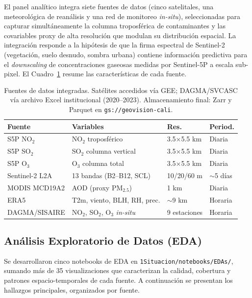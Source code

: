 \documentclass[10pt,a4paper,twocolumn]{article}
\begin{document}
El panel analítico integra siete fuentes de datos (cinco satelitales, una meteorológica de reanálisis y una red de monitoreo \textit{in-situ}), seleccionadas para capturar simultáneamente la columna troposférica de contaminantes y las covariables proxy de alta resolución que modulan su distribución espacial. La integración responde a la hipótesis de que la firma espectral de Sentinel-2 (vegetación, suelo desnudo, sombra urbana) contiene información predictiva para el \textit{downscaling} de concentraciones gaseosas medidas por Sentinel-5P a escala sub-pixel. El Cuadro~\ref{tab:fuentes} resume las características de cada fuente.

\begin{table}[H]
  \centering
  \scriptsize
  \begin{tabular}{p{2.1cm}p{2.1cm}p{1.2cm}p{1.5cm}}
    \toprule
    \textbf{Fuente} & \textbf{Variables} & \textbf{Res.} & \textbf{Period.} \\
    \midrule
    S5P NO$_2$ & NO$_2$ troposférico & 3.5$\times$5.5 km & Diaria \\
    S5P SO$_2$ & SO$_2$ columna vertical & 3.5$\times$5.5 km & Diaria \\
    S5P O$_3$ & O$_3$ columna total & 3.5$\times$5.5 km & Diaria \\
    Sentinel-2 L2A & 13 bandas (B2--B12, SCL) & 10/20/60 m & $\sim$5 días \\
    MODIS MCD19A2 & AOD (proxy PM$_{2.5}$) & 1 km & Diaria \\ \addlinespace
    ERA5 & T2m, viento, BLH, RH, prec. & $\sim$9 km & Horaria \\
    DAGMA/SISAIRE & NO$_2$, SO$_2$, O$_3$ \textit{in-situ} & 9 estaciones & Horaria \\
    \bottomrule
  \end{tabular}
  \caption{Fuentes de datos integradas. Satélites accedidos vía GEE; DAGMA/SVCASC vía archivo Excel institucional (2020--2023). Almacenamiento final: Zarr y Parquet en \texttt{gs://geovision-cali}.}
  \label{tab:fuentes}
\end{table}

\subsection{Análisis Exploratorio de Datos (EDA)}

Se desarrollaron cinco notebooks de EDA en \texttt{1Situacion/notebooks/EDAs/}, sumando más de 35 visualizaciones que caracterizan la calidad, cobertura y patrones espacio-temporales de cada fuente. A continuación se presentan los hallazgos principales, organizados por fuente.
\end{document}
